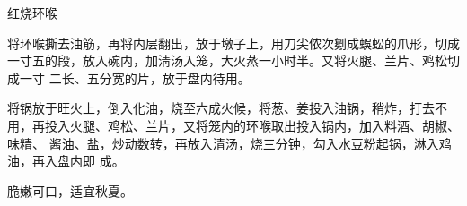 %
%
%
%
%
%
%
\begin{recipe}{红烧环喉}

\ingredients


\preparation

\step 将环喉撕去油筋，再将内层翻出，放于墩子上，用刀尖侬次劖成蜈蚣的爪形，切成
一寸五的段，放入碗内，加淸汤入笼，大火蒸一小时半。又将火腿、兰片、鸡松切成一寸
二长、五分宽的片，放于盘内待用。

\step 将锅放于旺火上，倒入化油，烧至六成火候，将葱、姜投入油锅，稍炸，打去不
用，再投入火腿、鸡松、兰片，又将笼内的环喉取出投入锅内，加入料酒、胡椒、味精、
酱油、盐，炒动数转，再放入清汤，烧三分钟，勾入水豆粉起锅，淋入鸡油，再入盘内即
成。

\features

脆嫩可口，适宜秋夏。

\end{recipe}

